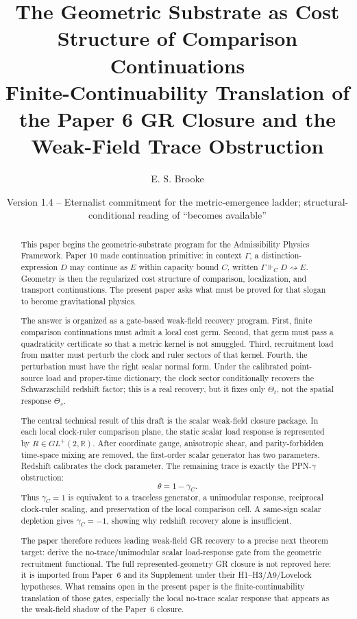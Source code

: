 \documentclass[11pt]{article}
\title{The Geometric Substrate as Cost Structure of Comparison Continuations\\
\large Finite-Continuability Translation of the Paper 6 GR Closure and the Weak-Field Trace Obstruction}
\author{E. S. Brooke}
\date{Version 1.4 -- Eternalist commitment for the metric-emergence ladder; structural-conditional reading of ``becomes available''}
\theoremstyle{remark}
\newcommand{\G}{\Gamma}
\newcommand{\entails}{\Vdash}
\newcommand{\goes}{\rightsquigarrow}
\begin{document}
\maketitle

\begin{abstract}
This paper begins the geometric-substrate program for the Admissibility Physics Framework.  Paper 10 made continuation primitive: in context \(\G\), a distinction-expression \(D\) may continue as \(E\) within capacity bound \(C\), written \(\G\entails_C D\goes E\).  Geometry is then the regularized cost structure of comparison, localization, and transport continuations.  The present paper asks what must be proved for that slogan to become gravitational physics.

The answer is organized as a gate-based weak-field recovery program.  First, finite comparison continuations must admit a local cost germ.  Second, that germ must pass a quadraticity certificate so that a metric kernel is not smuggled.  Third, recruitment load from matter must perturb the clock and ruler sectors of that kernel.  Fourth, the perturbation must have the right scalar normal form.  Under the calibrated point-source load and proper-time dictionary, the clock sector conditionally recovers the Schwarzschild redshift factor; this is a real recovery, but it fixes only \(\Theta_t\), not the spatial response \(\Theta_s\).

The central technical result of this draft is the scalar weak-field closure package.  In each local clock-ruler comparison plane, the static scalar load response is represented by \(R\in GL^+(2,\mathbb R)\).  After coordinate gauge, anisotropic shear, and parity-forbidden time-space mixing are removed, the first-order scalar generator has two parameters.  Redshift calibrates the clock parameter.  The remaining trace is exactly the PPN-\(\gamma\) obstruction:
\[
        \theta=1-\gamma_C.
\]
Thus \(\gamma_C=1\) is equivalent to a traceless generator, a unimodular response, reciprocal clock-ruler scaling, and preservation of the local comparison cell.  A same-sign scalar depletion gives \(\gamma_C=-1\), showing why redshift recovery alone is insufficient.

The paper therefore reduces leading weak-field GR recovery to a precise next theorem target: derive the no-trace/unimodular scalar load-response gate from the geometric recruitment functional.  The full represented-geometry GR closure is not reproved here: it is imported from Paper~6 and its Supplement under their H1--H3/A9/Lovelock hypotheses.  What remains open in the present paper is the finite-continuability translation of those gates, especially the local no-trace scalar response that appears as the weak-field shadow of the Paper~6 closure.
\end{abstract}
\end{document}
